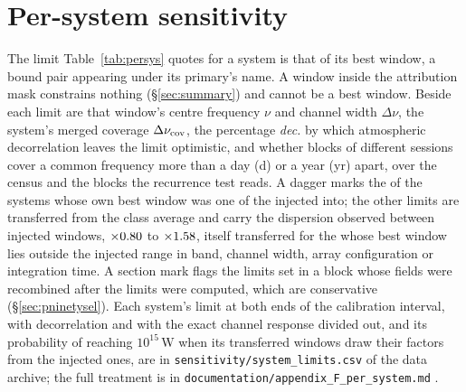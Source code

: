 \section{Per-system sensitivity}
\label{app:persys}

The limit Table~\ref{tab:persys} quotes for a system is that of its best
window, a bound pair appearing under its primary's name. A window inside the
attribution mask constrains nothing (\S\ref{sec:summary}) and cannot be a best
window. Beside each limit are that window's centre frequency $\nu$ and channel
width $\Delta\nu$, the system's merged coverage $\Delta\nu_{\rm cov}$, the
percentage \emph{dec.} by which atmospheric decorrelation leaves the limit
optimistic, and whether blocks of different sessions cover a common frequency
more than a day (d) or a year (yr) apart, over the census and the \ZcNRecEB{}
blocks the recurrence test reads. A dagger marks the \SmcNMeasSys{} of the
\NSysALim{} systems whose own best window was one of the \SensNInj{} injected
into; the other \SmcNEstSys{} limits are transferred from the class average
and carry the dispersion observed between injected windows,
$\times0.80$ to $\times1.58$, itself transferred for the
\NgNExtrapSys{} \NgExtrapSysNoun{} whose best window lies outside the injected
range in band, channel width, array configuration or integration time. A
section mark flags the \FcNSys{} limits set in a block whose fields were
recombined after the limits were computed, which are conservative
(\S\ref{sec:pninetysel}). Each
system's limit at both ends of the calibration interval, with decorrelation
and with the exact channel response divided out, and its probability of
reaching $10^{15}$\,W when its transferred windows draw their factors from the
injected ones, are in \texttt{sensitivity/\allowbreak system\_limits.csv} of
the data archive; the full treatment is in
\texttt{documentation/\allowbreak appendix\_F\_per\_system.md}
\citep{SIdeposit}.

